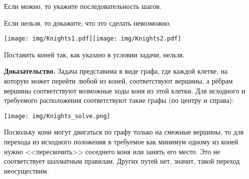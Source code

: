 \documentclass[a4paper,12pt]{article}
\begin{document}
Если можно, то укажите последовательность шагов.

Если нельзя, то докажите, что это сделать невозможно.

\begin{center}
\texttt{[image: img/Knights1.pdf]}\qquad \qquad \texttt{[image: img/Knights2.pdf]}
\end{center}

Поставить коней так, как указано в условии задачи, нельзя. \par
{\bf Доказательство.} Задача представима в виде графа, где каждой клетке, на которую может перейти любой из коней, соответствуют вершины, а рёбрам вершины соответствуют возможные ходы коня из этой клетки. Для исходного и требуемого расположения соответствуют такие графы (по центру и справа):
\begin{center}
\texttt{[image: img/Knights\_solve.png]}
\end{center}
Поскольку кони могут двигаться по графу только на смежные вершины, то для перехода из исходного положения в требуемое как минимум одному из коней нужно <<перескочить>> соседнего коня или занять его место. Это не соответствует шахматным правилам. Других путей нет, значит, такой переход неосуществим.
\end{document}
